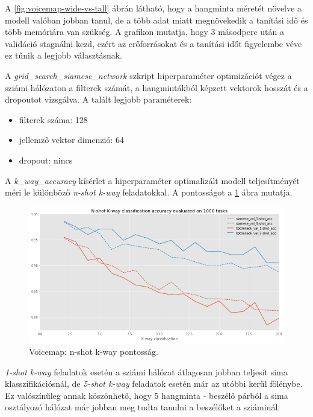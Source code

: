 A \ref{fig:voicemap-wide-vs-tall} ábrán látható, hogy a hangminta méretét növelve a modell valóban jobban tanul, de a több adat miatt megnövekedik a tanítási idő és több memóriára van szükség. A grafikon mutatja, hogy 3 másodperc után a validáció stagnálni kezd, ezért az erőforrásokat és a tanítási időt figyelembe véve ez tűnik a legjobb választásnak.

A \emph{grid\_search\_siamese\_network} szkript hiperparaméter optimizációt végez a sziámi hálózaton a filterek számát, a hangmintákból képzett vektorok hosszát és a dropoutot vizsgálva. A talált legjobb paraméterek:

\begin{itemize}
	\item filterek száma: 128
	\item jellemző vektor dimenzió: 64
	\item dropout: nincs
\end{itemize}

A \emph{k\_way\_accuracy} kísérlet a hiperparaméter optimalizált modell teljesítményét méri le különböző \emph{n-shot k-way} feladatokkal. A pontosságot a \ref{fig:voicemap-n-shot-k-way} ábra mutatja.

\begin{figure}[!ht]
	\centering
	\includegraphics[width=150mm, keepaspectratio]{figures/voicemap-n-shot-k-way.png}
	\caption{Voicemap: n-shot k-way pontosság.}
	\label{fig:voicemap-n-shot-k-way}
\end{figure}

\emph{1-shot k-way} feladatok esetén a sziámi hálózat átlagosan jobban teljesít sima klasszifikációsnál, de \emph{5-shot k-way} feladatok esetén már az utóbbi kerül fölénybe. Ez valószínűleg annak köszönhető, hogy 5 hangminta - beszélő párból a sima osztályozó hálózat már jobban meg tudta tanulni a beszélőket a sziáminál.


